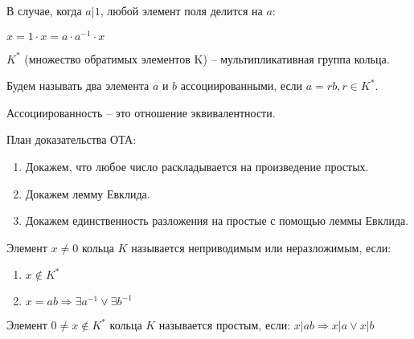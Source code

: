 \documentclass[document.tex]{subfiles}
\begin{document}
\begin{remark}
В случае, когда $a|1$, любой элемент поля делится на $a$:

$x = 1 \cdot x = a \cdot a^{-1} \cdot x$
\end{remark}

\begin{definition}
$K^*$ (множество обратимых элементов K) -- мультипликативная группа кольца.
\end{definition}

\begin{definition}
Будем называть два элемента $a$ и $b$ ассоциированными, если $a = rb, r \in K^*$.
\end{definition}

\begin{exercise}
Ассоциированность -- это отношение эквивалентности.
\end{exercise}

\begin{remark}
План доказательства ОТА:
\begin{enumerate}
\item Докажем, что любое число раскладывается на произведение простых.
\item Докажем лемму Евклида.
\item Докажем единственность разложения на простые с помощью леммы Евклида.
\end{enumerate}
\end{remark}

\begin{definition}
Элемент $x \neq 0$ кольца $K$ называется неприводимым или неразложимым, если:
\begin{enumerate}
\item $x \not \in K^*$
\item $x = ab \Rightarrow \exists a^{-1} \vee \exists b^{-1}$
\end{enumerate}
\end{definition}

\begin{definition}
Элемент $0 \neq x \not \in K^*$ кольца $K$ называется простым, если:
$x|ab \Rightarrow x|a \vee x|b$
\end{definition}
\end{document}
